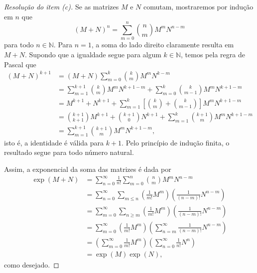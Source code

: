 \begin{proof}[Resolução do item (c)]
    Se as matrizes \(M\) e \(N\) comutam, mostraremos por indução em \(n\) que
    \begin{equation*}
        (M + N)^n = \sum_{m = 0}^{n} \binom{n}{m} M^m N^{n-m}
    \end{equation*}
    para todo \(n \in \mathbb{N}\). Para \(n = 1\), a soma do lado direito claramente resulta em \(M + N\). Supondo que a igualdade segue para algum \(k \in \mathbb{N}\), temos pela regra de Pascal que
    \begin{align*}
        (M+N)^{k+1} &= (M+N)\sum_{m=0}^k\binom{k}{m} M^m N^{k-m}\\
                    &= \sum_{m = 1}^{k+1} \binom{k}{m} M^m N^{k+1-m} + \sum_{m=0}^{k} \binom{k}{m-1} M^m N^{k+1-m}\\
                    &= M^{k+1} + N^{k+1} + \sum_{m=1}^{k} \left[\binom{k}{m} + \binom{k}{m-1}\right] M^m N^{k+1-m}\\
                    &= \binom{k+1}{k+1} M^{k+1} + \binom{k+1}{0}N^{k+1} + \sum_{m=1}^{k} \binom{k+1}{m} M^m N^{k+1-m}\\
                    &= \sum_{m=1}^{k+1} \binom{k+1}{m} M^m N^{k+1 - m},
    \end{align*}
    isto é, a identidade é válida para \(k+1\). Pelo princípio de indução finita, o resultado segue para todo número natural.

    Assim, a exponencial da soma das matrizes é dada por
    \begin{align*}
        \exp(M+N) &= \sum_{n = 0}^\infty \frac{1}{n!} \sum_{m=0}^n \binom{n}{m} M^m N^{n - m}\\
                  &= \sum_{n=0}^\infty \sum_{m\leq n} \left(\frac{1}{m!}M^m\right) \left(\frac{1}{(n-m)!} N^{n-m}\right)\\
                  &= \sum_{m=0}^\infty \sum_{n \geq m} \left(\frac{1}{m!} M^m\right) \left(\frac{1}{(n-m)!}N^{n-m}\right)\\
                  &= \sum_{m=0}^\infty \left(\frac{1}{m!} M^m\right) \left(\sum_{n=m}^\infty \frac{1}{(n-m)!} N^{n-m}\right)\\
                  &= \left(\sum_{m=0}^\infty \frac{1}{m!} M^m\right)\left(\sum_{n= 0}^\infty \frac{1}{n!} N^n\right)\\
                  &= \exp(M)\exp(N),
    \end{align*}
    como desejado.
\end{proof}
